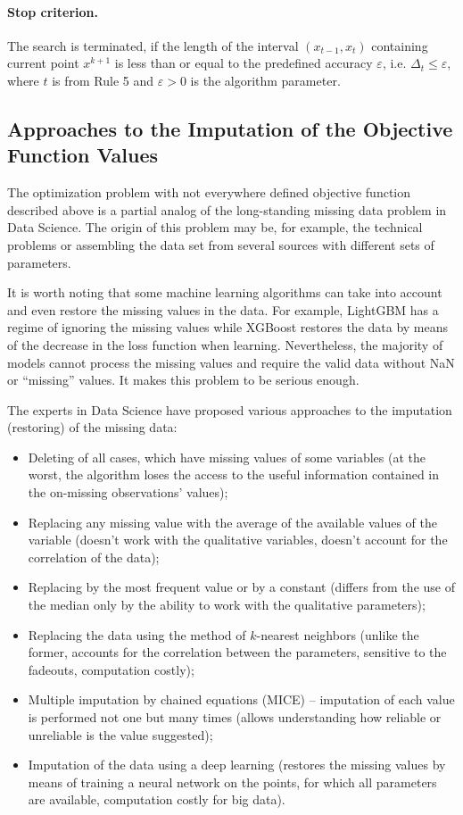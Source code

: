 \documentclass[runningheads]{llncs}
\begin{document}
\paragraph{Stop criterion.} The search is terminated, if the length of the interval $(x_{t-1},x_t)$ containing current point $x^{k+1}$ is less than or equal to the predefined accuracy $\varepsilon$, i.e. $\Delta _t \leq \varepsilon$, where $t$ is from Rule 5 and $\varepsilon>0$ is the algorithm parameter.

\subsection{ Approaches to the Imputation of the Objective Function Values }

The optimization problem with not everywhere defined objective function described above is a partial analog of the long-standing missing data problem in Data Science. The origin of this problem may be, for example, the technical problems or assembling the data set from several sources with different sets of parameters.

It is worth noting that some machine learning algorithms can take into account and even restore the missing values in the data. For example, LightGBM has a regime of ignoring the missing values while XGBoost restores the data by means of the decrease in the loss function when learning. Nevertheless, the majority of models cannot process the missing values and require the valid data without NaN or ``missing'' values. It makes this problem to be serious enough.

The experts in Data Science have proposed various approaches to the imputation (restoring) of the missing data:
\begin{itemize}
  \item Deleting of all cases, which have missing values of some variables (at the worst, the algorithm loses the access to the useful information contained in the on-missing observations’ values);
  \item Replacing any missing value with the average of the available values of the variable (doesn’t work with the qualitative variables, doesn’t account for the correlation of the data);
  \item Replacing by the most frequent value or by a constant (differs from the use of the median only by the ability to work with the qualitative parameters);
  \item Replacing the data using the method of $k$-nearest neighbors (unlike the former, accounts for the correlation between the parameters, sensitive to the fadeouts, computation costly);
  \item Multiple imputation by chained equations (MICE) -- imputation of each value is performed not one but many times (allows understanding how reliable or unreliable is the value suggested);
  \item Imputation of the data using a deep learning (restores the missing values by means of training a neural network on the points, for which all parameters are available, computation costly for big data).
\end{itemize}
\end{document}

